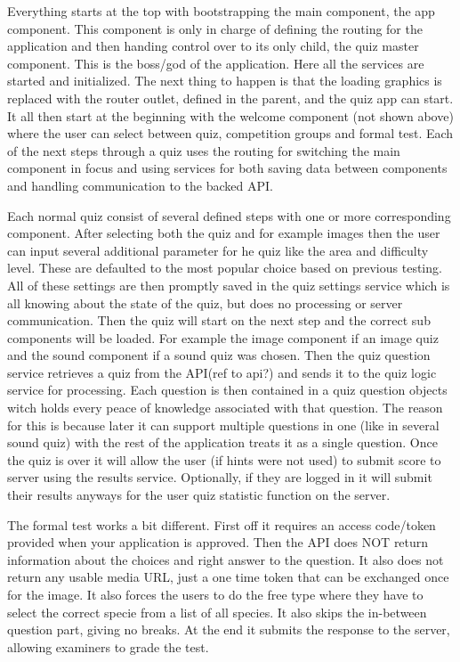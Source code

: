 Everything starts at the top with bootstrapping the main component, the app component. This component is only in charge of defining the routing for the application and then handing control over to its only child, the quiz master component. This is the boss/god of the application. Here all the services are started and initialized. The next thing to happen is that the loading graphics is replaced with the router outlet, defined in the parent, and the quiz app can start. It all then start at the beginning with the welcome component (not shown above) where the user can select between quiz, competition groups and formal test. Each of the next steps through a quiz uses the routing for switching the main component in focus and using services for both saving data between components and handling communication to the backed API.

Each normal quiz consist of several defined steps with one or more corresponding component. After selecting both the quiz and for example images then the user can input several additional parameter for he quiz like the area and difficulty level. These are defaulted to the most popular choice based on previous testing. All of these settings are then promptly saved in the quiz settings service which is all knowing about the state of the quiz, but does no processing or server communication. Then the quiz will start on the next step and the correct sub components will be loaded. For example the image component if an image quiz and the sound component if a sound quiz was chosen. Then the quiz question service retrieves a quiz from the API(ref to api?) and sends it to the quiz logic service for processing. Each question is then contained in a quiz question objects witch holds every peace of knowledge associated with that question. The reason for this is because later it can support  multiple questions in one (like in several sound quiz) with the rest of the application treats it as a single question. Once the quiz is over it will allow the user (if hints were not used) to submit score to server using the results service. Optionally, if they are logged in it will submit their results anyways for the user quiz statistic function on the server.

The formal test works a bit different. First off it requires an access code/token provided when your application is approved. Then the API does NOT return information about the choices and right answer to the question. It also does not return any usable media URL, just a one time token that can be exchanged once for the image. It also forces the users to do the free type where they have to select the correct specie from a list of all species. It also skips the in-between question part, giving no breaks. At the end it submits the response to the server, allowing examiners to grade the test. 

